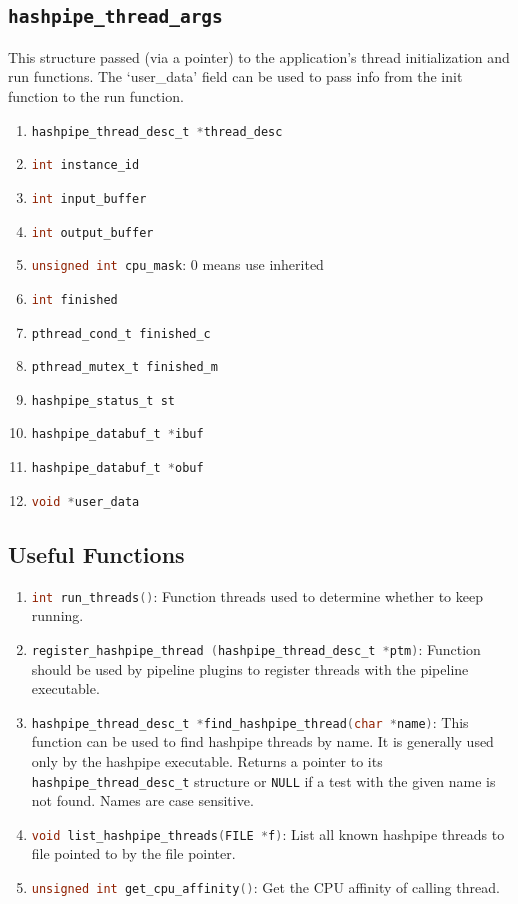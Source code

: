 \documentclass[12pt]{article}
\def\clst{\lstinline[basicstyle=\ttfamily,breaklines=true,language=C]}
\begin{document}
\subsection{\clst{hashpipe_thread_args}}

This structure passed (via a pointer) to the application's thread
initialization and run functions.  The `user\_data' field can be used to pass
info from the init function to the run function.

\begin{enumerate}

\item \clst{hashpipe_thread_desc_t *thread_desc}
\item \clst{int instance_id}
\item \clst{int input_buffer}
\item \clst{int output_buffer}
\item \clst{unsigned int cpu_mask}: 0 means use inherited
\item \clst{int finished}
\item \clst{pthread_cond_t finished_c}
\item \clst{pthread_mutex_t finished_m}
\item \clst{hashpipe_status_t st}
\item \clst{hashpipe_databuf_t *ibuf}
\item \clst{hashpipe_databuf_t *obuf}
\item \clst{void *user_data}
\end{enumerate}

\subsection{Useful Functions}

\begin{enumerate}
\item\clst{int run_threads()}: Function threads used to determine 
whether to keep running.

\item\clst{register_hashpipe_thread (hashpipe_thread_desc_t *ptm)}: 
Function should be used by pipeline plugins to register threads with 
the pipeline executable.

\item\clst{hashpipe_thread_desc_t *find_hashpipe_thread(char *name)}:
This function can be used to find hashpipe threads by name.  
It is generally used only by the hashpipe executable.  Returns a 
pointer to its \clst{hashpipe_thread_desc_t} structure or 
\clst{NULL} if a test with the given name is not found. Names are 
case sensitive.

\item\clst{void list_hashpipe_threads(FILE *f)}: List all known hashpipe threads 
to file pointed to by the file pointer.

\item\clst{unsigned int get_cpu_affinity()}: Get the CPU affinity of calling 
thread.

\end{enumerate}
\end{document}
